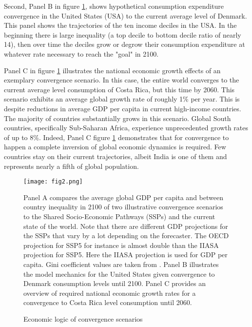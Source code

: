 \documentclass{article}
\begin{document}
Second, Panel B in figure \ref{Figure 2: Economic logic of convergence scenarios}, shows hypothetical consumption expenditure convergence in the United States (USA) to the current average level of Denmark. This panel shows the trajectories of the ten income deciles in the USA. In the beginning there is large inequality (a top decile to bottom decile ratio of nearly 14), then over time the deciles grow or degrow their consumption expenditure at whatever rate necessary to reach the "goal" in 2100.

Panel C in figure \ref{Figure 2: Economic logic of convergence scenarios} illustrates the national economic growth effects of an exemplary convergence scenario. In this case, the entire world converges to the current average level consumption of Costa Rica, but this time by 2060. This scenario exhibits an average global growth rate of roughly 1\% per year. This is despite reductions in average GDP per capita in current high-income countries. The majority of countries substantially grows in this scenario. Global South countries, specifically Sub-Saharan Africa, experience unprecedented growth rates of up to 8\%. Indeed, Panel C  figure \ref{Figure 2: Economic logic of convergence scenarios} demonstrates that for convergence to happen a complete inversion of global economic dynamics is required. Few countries stay on their current trajectories, albeit India is one of them and represents nearly a fifth of global population.

\begin{figure}[hbt!]
\centering
 \texttt{[image: fig2.png]}
  \caption{Economic logic of convergence scenarios}
  \label{Figure 2: Economic logic of convergence scenarios}
  \medskip
\small Panel A compares the average global GDP per capita and between country inequality in 2100 of two illustrative convergence scenarios to the Shared Socio-Economic Pathways (SSPs) and the current state of the world. Note that there are different GDP projections for the SSPs that vary by a lot depending on the forecaster. The OECD projection for SSP5 for instance is almost double than the IIASA projection for SSP5. Here the IIASA projection is used for GDP per capita. Gini coefficient values are taken from \parencite{benveniste2021tracing}. Panel B illustrates the model mechanics for the United States given convergence to Denmark consumption levels until 2100. Panel C provides an overview of required national economic growth rates for a convergence to Costa Rica level consumption until 2060.
\end{figure}
\end{document}
